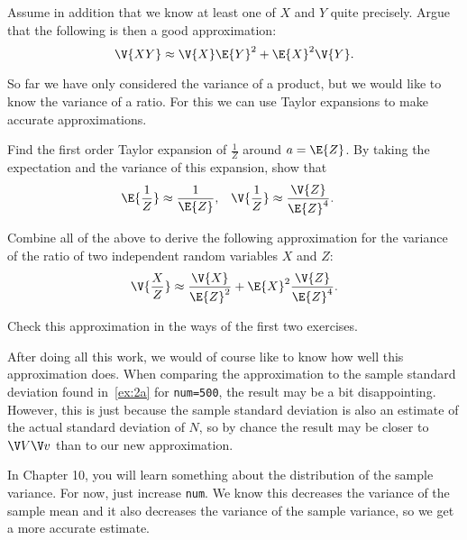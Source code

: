 \begin{exercise} \label{ex:beluga5}
Assume in addition that we know at least one of $X$ and $Y$ quite precisely. Argue that the following is then a good approximation:
\begin{equation*}
\V {X Y} \approx \V{X} \E {Y}^2 + \E {X}^2 \V{Y}.
\end{equation*}
\end{exercise}


So far we have only considered the variance of a product, but we would like to know the variance of a ratio.
For this we can use Taylor expansions to  make accurate approximations.

\begin{exercise}  \label{ex:beluga6}
Find the first order Taylor expansion of $\frac{1}{Z}$ around $a=  \E {Z}$. By taking the expectation and the variance of this expansion, show that
\begin{align*}
\E{\frac{1}{Z}} &\approx \frac{1}{\E{Z}}, & \V{\frac{1}{Z}} &\approx \frac{\V{Z}}{\E{Z}^4}.
\end{align*}
\end{exercise}

\begin{exercise}
Combine all of the above to derive the following approximation for the variance of the ratio of two independent random variables $X$ and $Z$:
\begin{equation*}
\V {\frac{X}{Z}} \approx \frac{\V{X}}{\E{Z}^2} + \E {X}^2\frac{\V{Z}}{\E{Z}^4}.
\end{equation*}
\end{exercise}


\begin{exercise}
Check this approximation in the ways of the first two exercises.
\end{exercise}



After doing all this work, we would of course like to know how well this approximation does.
When comparing the approximation to the sample standard deviation found in~\cref{ex:2a} for \texttt{num=500}, the result may be a bit disappointing.
However, this is just because the sample standard deviation is also an estimate of the actual standard deviation of $N$, so by chance the result may be closer to $\V V \V v$ than to our new approximation.

 In Chapter 10, you will learn something about the distribution of the sample variance. For now, just increase  \texttt{num}. We know this decreases the variance of the sample mean and it also decreases the variance of the sample variance, so we get a more accurate estimate.

